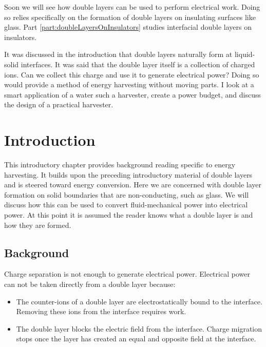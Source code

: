 
Soon we will see how double layers can be used to perform electrical work.
Doing so relies specifically on the formation of double layers on insulating surfaces like glass.
Part \ref{part:doubleLayersOnInsulators} studies interfacial double layers on insulators.

It was discussed in the introduction that double layers naturally form at liquid-solid interfaces.
It was said that the double layer itself is a collection of charged ions.
Can we collect this charge and use it to generate electrical power?
Doing so would provide a method of energy harvesting without moving parts.
I look at a smart application of a water such a harvester, create a power budget, and discuss the design of a practical harvester.

\chapter{Introduction}
  \label{chap:harvesterIntroduction}
  This introductory chapter provides background reading specific to energy harvesting.
  It builds upon the preceding introductory material of double layers and is steered toward energy conversion.
  Here we are concerned with double layer formation on solid boundaries that are non-conducting, such as glass.
  We will discuss how this can be used to convert fluid-mechanical power into electrical power.
  At this point it is assumed the reader knows what a double layer is and how they are formed.

  \section{Background}

    Charge separation is not enough to generate electrical power.
    Electrical power can not be taken directly from a double layer because:
    \begin{itemize}
        \item The counter-ions of a double layer are electrostatically bound to the interface.
            Removing these ions from the interface requires work.
        \item The double layer blocks the electric field from the interface.
            Charge migration stops once the layer has created an equal and opposite field at the interface.
    \end{itemize}

